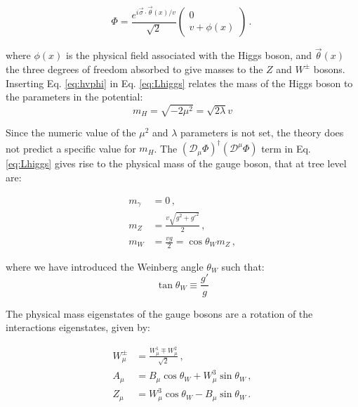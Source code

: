 \begin{equation}
	\Phi = \frac{e^{i \vec{\sigma} \cdot \vec{\theta}(x)/v }}{\sqrt{2}} \left( \begin{array}{c} 0 \\ v + \phi(x) \end{array} \right) \, . \
\label{eq:hvphi}
\end{equation}

\noindent where $\phi(x)$ is the physical field associated with the Higgs boson, and $\vec{\theta}(x)$ the three degrees of freedom absorbed to give masses to the $Z$ and $W^\pm$ bosons. Inserting Eq. \ref{eq:hvphi} in Eq. \ref{eq:Lhiggs} relates the mass of the Higgs boson to the parameters in the potential:
\begin{equation}
m_H = \sqrt{- 2 \mu^2} = \sqrt{2 \lambda} v
\label{eq:sm:higgsmass}
\end{equation}

Since the numeric value of the $\mu^2$ and $\lambda$ parameters is not set, the theory does not predict a specific value for $m_H$. The $(\mathcal{D}_{\mu} \Phi)^{\dagger} (\mathcal{D}^{\mu} \Phi)$ term in Eq. \ref{eq:Lhiggs} gives rise to the physical mass of the gauge boson, that at tree level are:

\begin{equation}
\begin{aligned}
m_\gamma &= 0 \, ,\\
m_Z &= \frac{v \sqrt{g^2 + g'^2}}{2} \, , \\
m_W &= \frac{vg}{2} =  \cos\theta_W m_Z \, ,
\end{aligned}
\end{equation}

\noindent where we have introduced the Weinberg angle $\theta_W$ such that:
\begin{equation}
\tan\theta_W \equiv \frac{g'}{g}
\end{equation}

The physical mass eigenstates of the gauge bosons are a rotation of the interactions eigenstates, given by:

\begin{equation}
\begin{aligned}
W_\mu^\pm &= \frac{W_\mu^1 \mp W_\mu^2}{\sqrt{2}} \, , \\
A_\mu &= B_\mu \cos\theta_W + W^3_\mu \sin\theta_W \, ,  \\
Z_\mu &= W^3_\mu \cos\theta_W - B_\mu \sin\theta_W \, .
\end{aligned}
\label{eq:wein}
\end{equation}

